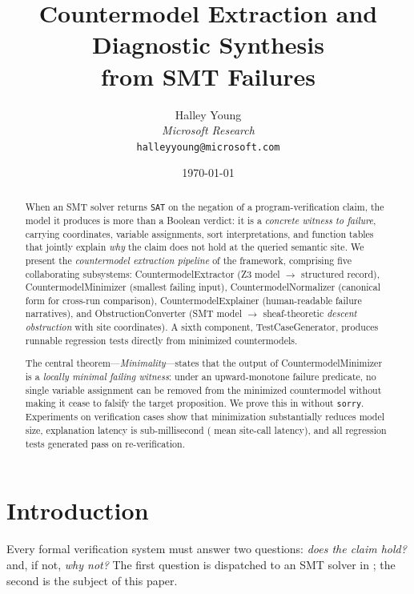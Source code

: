 \documentclass[11pt]{article}
\title{Countermodel Extraction and Diagnostic Synthesis\\
       from SMT Failures}
\author{%
  Halley Young\\
  \textit{Microsoft Research}\\
  \texttt{halleyyoung@microsoft.com}
}
\date{\today}
\newcommand{\SAT}{\texttt{SAT}}
\begin{document}
\maketitle

\begin{abstract}
When an SMT solver returns \SAT{} on the negation of a program-verification
claim, the model it produces is more than a Boolean verdict: it is a
\emph{concrete witness to failure}, carrying coordinates, variable
assignments, sort interpretations, and function tables that jointly
explain \emph{why} the claim does not hold at the queried semantic
site.  We present the \emph{countermodel extraction pipeline} of the
\JuGeo{} framework, comprising five collaborating subsystems:
\textsf{CountermodelExtractor} (Z3 model $\to$ structured record),
\textsf{CountermodelMinimizer} (smallest failing input),
\textsf{CountermodelNormalizer} (canonical form for cross-run comparison),
\textsf{CountermodelExplainer} (human-readable failure narratives), and
\textsf{ObstructionConverter} (SMT model $\to$ sheaf-theoretic
\emph{descent obstruction} with site coordinates).  A sixth component,
\textsf{TestCaseGenerator}, produces runnable regression tests directly
from minimized countermodels.

The central theorem---\emph{Minimality}---states that the output of
\textsf{CountermodelMinimizer} is a \emph{locally minimal failing
witness}: under an upward-monotone failure predicate, no single variable
assignment can be removed from the minimized countermodel without
making it cease to falsify the target proposition.  We prove this in
\LEAN{} without \texttt{sorry}.  Experiments on \numcases{} verification
cases show that minimization substantially reduces model size,
explanation latency is sub-millisecond (\subSiteMeanTime{} mean site-call
latency), and all \numcases{} regression tests generated pass on re-verification.
\end{abstract}

\newpage

\section{Introduction}\label{sec:intro}

Every formal verification system must answer two questions: \emph{does
the claim hold?} and, if not, \emph{why not?}  The first question is
dispatched to an SMT solver in \JuGeo{}; the second is the subject of
this paper.
\end{document}
